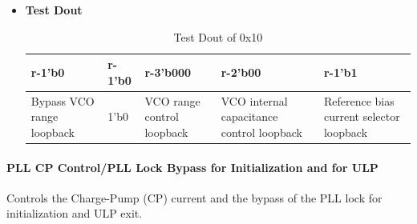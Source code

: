 \documentclass[main\_\_EN.tex]{subfiles}
\begin{document}
\begin{itemize}
\begin{itemize}
\begin{itemize}
                \end{itemize}
        \end{itemize}
    \item \textbf{Test Dout}
        \begin{longtable}{ |p{3cm}|p{3cm}|p{3cm}|p{3cm}|p{3cm}|}
            \caption{Test Dout of 0x10}
            \label{tab:test-dout-0x10} \\
            \hline
            \rowcolor{lightgray}
            \textbf{r-1'b0} & \textbf{r-1'b0} & \textbf{r-3'b000} & \textbf{r-2'b00} & \textbf{r-1'b1} \\ \hline
            Bypass VCO range loopback & 1'b0 & VCO range control loopback & VCO internal capacitance control loopback & Reference bias current selector loopback  \\ \hline
        \end{longtable}
\end{itemize}

\paragraph{PLL CP Control/PLL Lock Bypass for Initialization and for ULP}
\label{sec:test-code-0x11}
Controls the Charge-Pump (CP) current and the bypass of the PLL lock for initialization and ULP exit.
\end{document}
